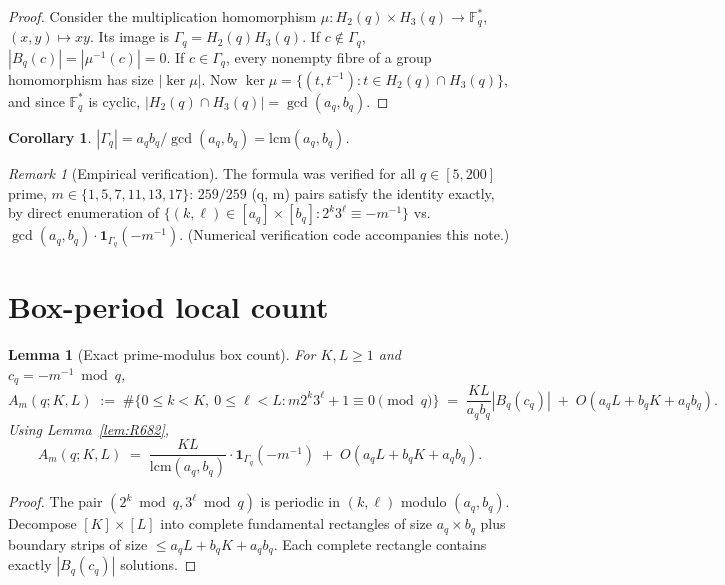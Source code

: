 \documentclass[12pt]{amsart}
\newtheorem{lemma}{Lemma}
\newtheorem{corollary}{Corollary}
\theoremstyle{definition}
\theoremstyle{remark}
\newtheorem{remark}{Remark}
\begin{document}
\begin{proof}
Consider the multiplication homomorphism $\mu : H_2(q) \times H_3(q) \to \mathbb{F}_q^*$,
$(x, y) \mapsto xy$. Its image is $\Gamma_q = H_2(q) H_3(q)$. If $c \notin \Gamma_q$,
$|B_q(c)| = |\mu^{-1}(c)| = 0$. If $c \in \Gamma_q$, every nonempty fibre of a group
homomorphism has size $|\ker \mu|$. Now
$\ker \mu = \{(t, t^{-1}) : t \in H_2(q) \cap H_3(q)\}$, and since $\mathbb{F}_q^*$ is
cyclic, $|H_2(q) \cap H_3(q)| = \gcd(a_q, b_q)$.
\end{proof}

\begin{corollary}\label{cor:Gamma-size}
$|\Gamma_q| = a_q b_q / \gcd(a_q, b_q) = \mathrm{lcm}(a_q, b_q)$.
\end{corollary}

\begin{remark}[Empirical verification]
The formula was verified for all $q \in [5, 200]$ prime, $m \in \{1, 5, 7, 11, 13, 17\}$:
$259/259$ (q, m) pairs satisfy the identity exactly, by direct enumeration of
$\{(k, \ell) \in [a_q] \times [b_q] : 2^k 3^\ell \equiv -m^{-1}\}$ vs.\
$\gcd(a_q, b_q) \cdot \mathbf{1}_{\Gamma_q}(-m^{-1})$.
\hfill(Numerical verification code accompanies this note.)
\end{remark}

\section{Box-period local count}

\begin{lemma}[Exact prime-modulus box count]\label{lem:R683}
For $K, L \ge 1$ and $c_q = -m^{-1} \bmod q$,
$$
A_m(q; K, L)
\;:=\;
\# \{0 \le k < K,\ 0 \le \ell < L : m 2^k 3^\ell + 1 \equiv 0 \pmod q\}
\;=\;
\frac{KL}{a_q b_q} |B_q(c_q)|
\;+\;
O(a_q L + b_q K + a_q b_q).
$$
Using Lemma~\ref{lem:R682},
$$
A_m(q; K, L)
\;=\;
\frac{KL}{\mathrm{lcm}(a_q, b_q)} \cdot \mathbf{1}_{\Gamma_q}(-m^{-1})
\;+\;
O(a_q L + b_q K + a_q b_q).
$$
\end{lemma}

\begin{proof}
The pair $(2^k \bmod q, 3^\ell \bmod q)$ is periodic in $(k, \ell)$ modulo $(a_q, b_q)$.
Decompose $[K] \times [L]$ into complete fundamental rectangles of size $a_q \times b_q$
plus boundary strips of size $\le a_q L + b_q K + a_q b_q$.
Each complete rectangle contains exactly $|B_q(c_q)|$ solutions.
\end{proof}
\end{document}
